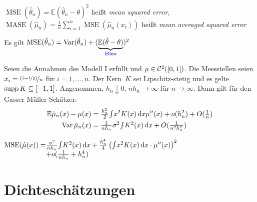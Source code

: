 \documentclass{cheat-sheet}
\newcommand{\E}{\mathbb{E}} %
\newcommand{\Cont}{\mathcal{C}} %
\DeclareMathOperator{\MSE}{MSE} %
\DeclareMathOperator{\MASE}{MASE} %
\DeclareMathOperator{\var}{Var} %
\begin{document}
\begin{defn}
    $\MSE(\hat{\theta}_n) = \E (\hat{\theta}_n - \theta)^2$ heißt \textit{mean squared error},
    $\MASE(\hat{\mu}_n) = \tfrac{1}{n} \sum_{i=1}^n \MSE(\hat{\mu}_n (x_i))$
     heißt \textit{mean averaged squared error}
\end{defn}

\begin{bem}
  Es gilt \enspace
  $\MSE(\hat{\theta}_n) = \var(\hat{\theta}_n) + (\underbrace{\E (\hat{\theta} - \theta)}_{\text{\emph{Bias}}})^2$
\end{bem}

\begin{satz}
  Seien die Annahmen des Modell I erfüllt und $\mu \in \Cont^2(\cinterval{0}{1})$.
  Die Messstellen seien $x_i = \nicefrac{(i - \nicefrac{1}{2})}{n}$ für $i = 1, \ldots, n$.
  Der Kern~$K$ sei Lipschitz-stetig und es gelte $\operatorname{supp} K \subseteq \left[ -1, 1 \right]$.
  Angenommen, $h_n \downarrow 0$, $n h_n \to \infty$ für $n \to \infty$.
  Dann gilt für den Gasser-Müller-Schätzer:
  \begin{align*}
    \E \hat{\mu}_n(x) - \mu(x) & = \tfrac{h_n^2}{2} \IInt{x^2 K(x)}{x} \mu''(x) + o(h_n^2) + O(\tfrac{1}{n}) \\
    \var \hat{\mu}_n (x) & = \tfrac{1}{n h_n} \sigma^2 \IInt{K^2(x)}{x} + O(\tfrac{1}{n^2 h_n^2})
  \end{align*}
\end{satz}

\begin{kor}
  $
    \arraycolsep=0.2pt
    \begin{array}[t]{r l}
      \MSE(\hat{\mu}(x)) = & \tfrac{\sigma^2}{n h_n} \IInt{K^2 (x)}{x} + \tfrac{h_n^4}{4} \left( \IInt{x^2 K(x)}{x} \cdot \mu''(x) \right)^2 \\
      & + o(\tfrac{1}{n h_n} + h_n^4)
    \end{array}
  $
\end{kor}

\columnbreak


\section{Dichteschätzungen}
\end{document}
